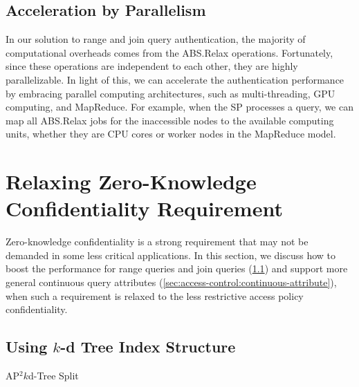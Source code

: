 \subsection{Acceleration by Parallelism}
In our solution to range and join query authentication, the majority of computational overheads comes from the \textsf{ABS.Relax} operations. Fortunately, since these operations are independent to each other, they are highly parallelizable. In light of this, we can accelerate the authentication performance by embracing parallel computing architectures, such as multi-threading, GPU computing, and MapReduce. For example, when the SP processes a query, we can map all \textsf{ABS.Relax} jobs for the inaccessible nodes to the available computing units, whether they are CPU cores or worker nodes in the MapReduce model.

\section{Relaxing Zero-Knowledge Confidentiality Requirement}\label{sec:access-control:relaxing-zero-knowledge}

Zero-knowledge confidentiality is a strong requirement that may not be demanded in some less critical applications. In this section, we discuss how to boost the performance for range queries and join queries (\cref{sec:access-control:kd-tree}) and support more general continuous query attributes (\cref{sec:access-control:continuous-attribute}), when such a requirement is relaxed to the less restrictive access policy confidentiality.

\subsection{Using $k$-d Tree Index Structure}\label{sec:access-control:kd-tree}

\begin{algorithm}[t]
    \caption{AP$^2k$d-Tree Split}\label{alg:access-control:kd-split}
\end{algorithm}

